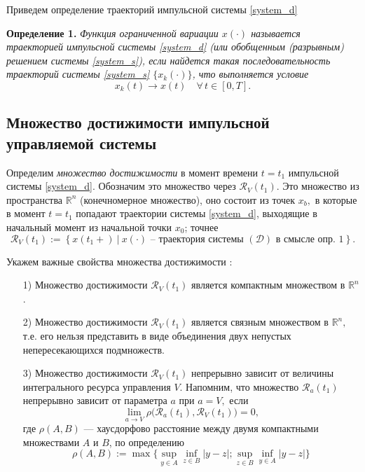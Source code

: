 Приведем определение траекторий импульсной системы \eqref{system_d}

{\bf Определение 1.}
  {\it Функция ограниченной вариации $x(\cdot)$ называется траекторией
  импульсной системы \eqref{system_d} (или обобщенным (разрывным)
  решением системы \eqref{system_s}), если найдется такая последовательность
  траекторий системы \eqref{system_s} $\bigl\{x_k(\cdot)\bigr\}$, что выполняется
  условие 
\begin{equation*}
  x_k(t)\to x(t) \quad  \forall \, t\in [0,T].
\end{equation*}}

\subsection{Множество достижимости импульсной управляемой системы}
\label{sec:rsids}


Определим \emph{множество достижимости} в момент  времени $t=t_1$
импульсной системы \eqref{system_d}. Обозначим это множество через 
$ {\mathcal R}_V(t_1)$. Это множество из  пространства ${\mathbb R}^n$
(конечномерное  множество), оно состоит из точек $x_b,$ в  которые в
момент $t=t_1$ попадают траектории  системы \eqref{system_d}, выходящие
в начальный  момент из начальной точки $x_0$; точнее
\begin{equation*} 
  {\mathcal R}_V(t_1):=\left\{ x(t_1+) \ \big| \
    x(\cdot) \mbox{ -- траектория системы } ({\mathcal D}) \mbox{ в
      смысле опр. 1} \right\}.
\end{equation*}

Укажем важные свойства множества достижимости \cite{ZS1991, SS2010}:

\begin{itemize}
\item[ 1)] Множество достижимости ${\mathcal R}_V(t_1)$ является
компактным множеством в ${\mathbb R}^n$.
\item[ 2)] Множество достижимости ${\mathcal R}_V(t_1)$ является связным
множеством в ${\mathbb R}^n,$ т.е. его нельзя представить в виде
объединения двух непустых непересекающихся подмножеств.
\item[ 3)] Множество достижимости ${\mathcal R}_V(t_1)$ непрерывно
зависит от величины интегрального ресурса управления $V$. Напомним,
что множество ${\mathcal R}_a(t_1)$ непрерывно зависит от параметра $a$
при $a=V,$ если
\begin{equation*} 
  \lim_{a\to V} \rho\Big( {\mathcal R}_a(t_1) , {\mathcal
    R}_V(t_1) \Big) =0 ,
\end{equation*} где $\rho(A,B)$ --- хаусдорфово расстояние между двумя компактными
множествами $A$ и $B$, по определению
\begin{equation}
  \label{eq:hausd_dist}
  \rho(A,B):=\max\bigl\{ \sup\limits_{y\in
A}\inf\limits_{z\in B} |y-z| ; \sup\limits_{z\in B}\inf\limits_{y\in
A} |y-z| \bigr\}
\end{equation}
\end{itemize}

